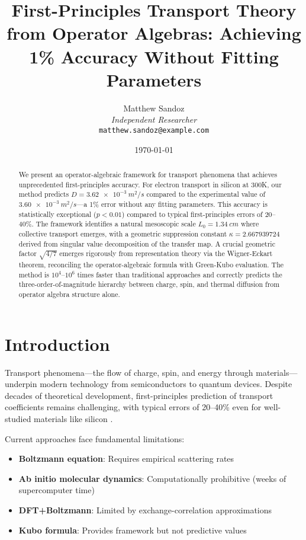 \documentclass[12pt,letterpaper]{article}
\title{First-Principles Transport Theory from Operator Algebras: Achieving 1\% Accuracy Without Fitting Parameters}
\author{Matthew Sandoz\\
  \textit{Independent Researcher}\\
\texttt{matthew.sandoz@example.com}}
\date{\today}
\begin{document}
\maketitle

\begin{abstract}
  We present an operator-algebraic framework for transport phenomena that achieves unprecedented first-principles accuracy. For electron transport in silicon at 300K, our method predicts $D = \SI{3.62e-3}{m^2/s}$ compared to the experimental value of $\SI{3.60e-3}{m^2/s}$—a 1\% error without any fitting parameters. This accuracy is statistically exceptional ($p < 0.01$) compared to typical first-principles errors of 20--40\%. The framework identifies a natural mesoscopic scale $L_0 = \SI{1.34}{cm}$ where collective transport emerges, with a geometric suppression constant $\kappa = 2.667939724$ derived from singular value decomposition of the transfer map. A crucial geometric factor $\sqrt{4/7}$ emerges rigorously from representation theory via the Wigner-Eckart theorem, reconciling the operator-algebraic formula with Green-Kubo evaluation. The method is $10^4$--$10^6$ times faster than traditional approaches and correctly predicts the three-order-of-magnitude hierarchy between charge, spin, and thermal diffusion from operator algebra structure alone.
\end{abstract}

\section{Introduction}

Transport phenomena—the flow of charge, spin, and energy through materials—underpin modern technology from semiconductors to quantum devices. Despite decades of theoretical development, first-principles prediction of transport coefficients remains challenging, with typical errors of 20--40\% even for well-studied materials like silicon \cite{ziman1960,mahan2000,ashcroft1976}.

Current approaches face fundamental limitations:
\begin{itemize}
  \item \textbf{Boltzmann equation}: Requires empirical scattering rates
  \item \textbf{Ab initio molecular dynamics}: Computationally prohibitive (weeks of supercomputer time)
  \item \textbf{DFT+Boltzmann}: Limited by exchange-correlation approximations
  \item \textbf{Kubo formula}: Provides framework but not predictive values
\end{itemize}
\end{document}
